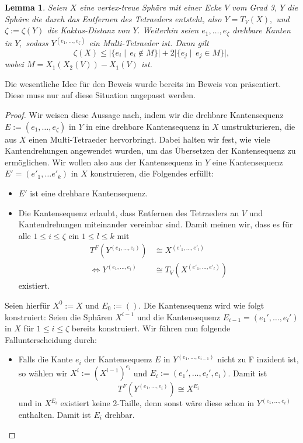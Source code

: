 \documentclass[12pt,titlepage,twoside,cleardoublepage]{article}
\theoremstyle{nummermitklammern}
\newtheorem{lemma}[temp]{Lemma}
\newtheorem{lemma}[zahl]{Lemma}
\numberwithin{equation}{section}
\begin{document}
\begin{lemma}
Seien $X$ eine vertex-treue Sphäre mit einer Ecke $V$ vom Grad 3,  $Y$ die Sphäre die durch das Entfernen des Tetraeders entsteht, also $Y=T_V(X),$ und $\zeta:=\zeta(Y)$ die Kaktus-Distanz von $Y.$ Weiterhin seien $e_1,\ldots,e_{\zeta}$ drehbare Kanten in $Y,$ sodass $Y^{(e_1,\ldots,e_{\zeta})}$ ein Multi-Tetraeder ist. Dann gilt
\[
\zeta(X)\leq \vert\{e_i\mid \, e_i \notin M\}\vert+2\vert \{e_j\mid \, e_j \in M\}\vert,
\]
wobei $M=X_1(X_2(V))-X_1(V)$ ist.
\end{lemma}
Die wesentliche Idee für den Beweis wurde bereits im Beweis von  präsentiert. Diese muss nur auf diese Situation angepasst werden.
\begin{proof}
Wir weisen diese Aussage nach, indem wir die drehbare Kantensequenz $E:=(e_1,\ldots , e_{\zeta})$
in $Y$ in eine drehbare Kantensequenz in $X$ umstrukturieren, die aus $X$ einen
Multi-Tetraeder hervorbringt. Dabei halten wir fest, wie viele Kantendrehungen angewendet wurden, um das Übersetzen der Kantensequenz zu ermöglichen.
Wir wollen also aus der Kantensequenz in $Y$ eine Kantensequenz $E'=(e'_1,\ldots e'_k)$ in $X$ konstruieren, die Folgendes erfüllt:
\begin{itemize}
\item $E'$ ist eine drehbare Kantensequenz.
\item Die Kantensequenz erlaubt, dass Entfernen des Tetraeders an  $V$ und Kantendrehungen miteinander vereinbar sind. Damit meinen wir, dass es für alle $1\leq i\leq \zeta$ ein $1\leq l \leq k$ mit 
\begin{align*}
T^F(Y^{(e_1,\ldots, e_i)})&\cong X^{(e'_1,\ldots,e'_l)} \\
\Leftrightarrow Y^{(e_1,\ldots, e_i)}&\cong T_V(X^{(e'_1,\ldots,e'_l)})
\end{align*} 
existiert.
\end{itemize}
Seien  hierfür $X^0:=X$ und $E_0:=().$ Die Kantensequenz wird wie folgt konstruiert: Seien die Sphären $X^{i-1}$ und die Kantensequenz $E_{i-1}=(e_1',\ldots,e_l')$ in $X$ für $1\leq i \leq \zeta$ bereits konstruiert. Wir führen nun folgende Fallunterscheidung durch:
\begin{itemize}
\item Falls die Kante $e_{i}$ der Kantensequenz $E$ in $Y^{(e_1,\ldots,e_{i-1})}$ nicht zu F inzident ist, so wählen wir $X^{i}:={(X^{i-1})}^{e_i}$ und $E_{i}:=(e_1',\ldots,e_l',e_i)$. Damit ist 
\[
T^F(Y^{(e_1,\ldots,e_i)})\cong X^{E_{i}}
\]
und in $X^{E_{i}}$ existiert keine 2-Taille, denn sonst wäre diese schon in $Y^{(e_1,\ldots,e_i)}$ enthalten. Damit ist $E_{i}$ drehbar.

\end{itemize}
\end{proof}
\end{document}

